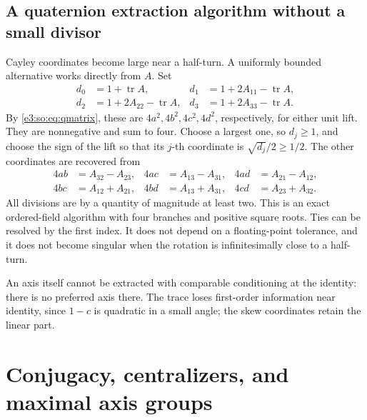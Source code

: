 \documentclass[11pt,letterpaper]{article}
\numberwithin{equation}{section}
\theoremstyle{definition}
\theoremstyle{remark}
\newcommand{\tr}{\operatorname{tr}}
\begin{document}
\subsection{A quaternion extraction algorithm without a small divisor}

Cayley coordinates become large near a half-turn. A uniformly bounded alternative
works directly from \(A\). Set
\begin{align*}
 d_0&=1+\tr A,&
 d_1&=1+2A_{11}-\tr A,\\
 d_2&=1+2A_{22}-\tr A,&
 d_3&=1+2A_{33}-\tr A.
\end{align*}
By \cref{e3:so:eq:qmatrix}, these are \(4a^2,4b^2,4c^2,4d^2\), respectively, for
either unit lift. They are nonnegative and sum to four. Choose a largest one,
so \(d_j\ge1\), and choose the sign of the lift so that its \(j\)-th coordinate
is \(\sqrt{d_j}/2\ge1/2\). The other coordinates are recovered from
\begin{align*}
 4ab&=A_{32}-A_{23},&4ac&=A_{13}-A_{31},&4ad&=A_{21}-A_{12},\\
 4bc&=A_{12}+A_{21},&4bd&=A_{13}+A_{31},&4cd&=A_{23}+A_{32}.
\end{align*}
All divisions are by a quantity of magnitude at least two. This is an exact
ordered-field algorithm with four branches and positive square roots. Ties can
be resolved by the first index. It does not depend on a floating-point tolerance,
and it does not become singular when the rotation is infinitesimally close to a
half-turn.

An axis itself cannot be extracted with comparable conditioning at the identity:
there is no preferred axis there. The trace loses first-order information near
identity, since \(1-c\) is quadratic in a small angle; the skew coordinates
retain the linear part.

\section{Conjugacy, centralizers, and maximal axis groups}\label{e3:so:sec:conjugacy}
\end{document}
